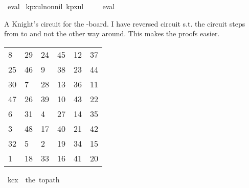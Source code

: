 \begin{isabellebody}
\isamarkupfalse%
\ eval%
\endisatagproof
{\isafoldproof}%
%
\isadelimproof
%
\endisadelimproof
\isanewline
\isanewline
{}\isamarkupfalse%
\ kp{\isacharunderscore}{\kern0pt}{}x{}{\isacharunderscore}{\kern0pt}ul{\isacharunderscore}{\kern0pt}non{\isacharunderscore}{\kern0pt}nil{\isacharcolon}{\kern0pt}\ {\isachardoublequoteopen}kp{}x{}ul\ {\isasymnoteq}\ {\isacharbrackleft}{\kern0pt}{\isacharbrackright}{\kern0pt}{\isachardoublequoteclose}%
\isadelimproof
\ %
\endisadelimproof
%
\isatagproof
{}\isamarkupfalse%
\ eval%
\endisatagproof
{\isafoldproof}%
%
\isadelimproof
%
\endisadelimproof
%
\begin{isamarkuptext}%
A Knight's circuit for the -board. I have reversed circuit s.t. the circuit steps 
from  to  and not the other way around. This makes the proofs easier.
  \begin{table}[H]
    \begin{tabular}{llllll}
       8 & 29 & 24 & 45 & 12 & 37 \\
      25 & 46 &  9 & 38 & 23 & 44 \\
      30 &  7 & 28 & 13 & 36 & 11 \\
      47 & 26 & 39 & 10 & 43 & 22 \\
       6 & 31 &  4 & 27 & 14 & 35 \\
       3 & 48 & 17 & 40 & 21 & 42 \\
      32 &  5 &  2 & 19 & 34 & 15 \\
       1 & 18 & 33 & 16 & 41 & 20
    \end{tabular}
  \end{table}%
\end{isamarkuptext}\isamarkuptrue%
\isamarkupfalse%
\ {\isachardoublequoteopen}kc{}x{}\ {\isasymequiv}\ the\ {\isacharparenleft}{\kern0pt}to{\isacharunderscore}{\kern0pt}path\ \isanewline
\ \ {\isacharbrackleft}{\kern0pt}{\isacharbrackleft}{\kern0pt}{}{\isacharcomma}{\kern0pt}{}{}{\isacharcomma}{\kern0pt}{}{}{\isacharcomma}{\kern0pt}{}{}{\isacharcomma}{\kern0pt}{}{}{\isacharcomma}{\kern0pt}{}{}{\isacharbrackright}{\kern0pt}{\isacharcomma}{\kern0pt}\isanewline

\end{isabellebody}
